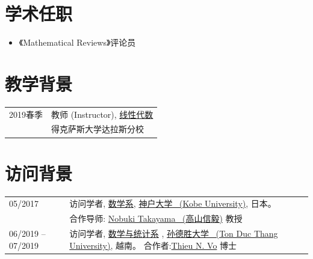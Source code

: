 \documentclass[a4paper,12pt]{article}
\begin{document}
\begin{CJK*}{UTF8}{gbsn}
\section*{学术任职}
\begin{itemize}
 \item 《Mathematical Reviews》评论员
\end{itemize}

\section*{教学背景}
\begin{tabular}{@{}p{1.4in}p{4in}}
2019春季           & 教师 (Instructor), \href{https://yzhang1616.github.io/algebra19spring/algebra.html}{线性代数} \\
                      & 得克萨斯大学达拉斯分校
\end{tabular}


\section*{\Large{访问背景}}
\begin{tabular}{@{}p{1.4in}p{4.5in}}
05/2017               & 访问学者, 
                        \href{http://www.math.kobe-u.ac.jp/}{数学系},
                        \href{http://www.kobe-u.ac.jp/en/}{神户大学 \ (Kobe University)}, 日本。\\                       
                        & 合作导师: \href{http://www.math.kobe-u.ac.jp/home-j/takayama-e.html}{Nobuki Takayama \ (高山信毅)} 教授\\
06/2019 -- 07/2019               & 访问学者, 
                        \href{https://fms.tdtu.edu.vn/}{数学与统计系} ,
                        \href{https://tdtu.edu.vn/}{孙德胜大学 \ (Ton Duc Thang University)}, 越南。
                        合作者:\href{https://sites.google.com/tdtu.edu.vn/vongocthieu}{Thieu N. Vo} 博士\\                        
\end{tabular}



\end{CJK*}
\end{document}
